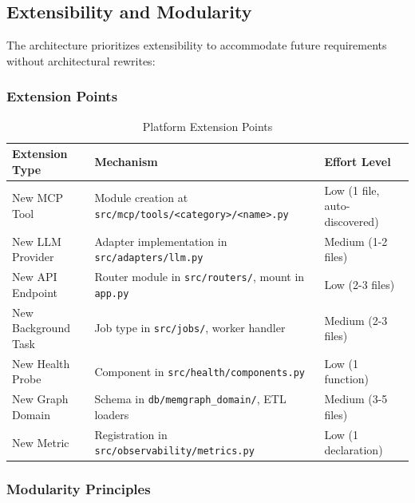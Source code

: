 \subsection{Extensibility and Modularity}
\label{subsec:extensibility}

The architecture prioritizes extensibility to accommodate future requirements without architectural rewrites:

\subsubsection{Extension Points}

\begin{table}[htbp]
\centering
\caption{Platform Extension Points}
\label{tab:extension-points}
\small
\begin{tabularx}{\textwidth}{|>{\raggedright\arraybackslash}p{2.8cm}|>{\raggedright\arraybackslash}X|>{\raggedright\arraybackslash}p{2.5cm}|}
\hline
\textbf{Extension Type} & \textbf{Mechanism} & \textbf{Effort Level} \\
\hline
New MCP Tool & Module creation at \texttt{src/mcp/tools/<category>/<name>.py} & Low (1 file, auto-discovered) \\
\hline
New LLM Provider & Adapter implementation in \texttt{src/adapters/llm.py} & Medium (1-2 files) \\
\hline
New API Endpoint & Router module in \texttt{src/routers/}, mount in \texttt{app.py} & Low (2-3 files) \\
\hline
New Background Task & Job type in \texttt{src/jobs/}, worker handler & Medium (2-3 files) \\
\hline
New Health Probe & Component in \texttt{src/health/components.py} & Low (1 function) \\
\hline
New Graph Domain & Schema in \texttt{db/memgraph\_domain/}, ETL loaders & Medium (3-5 files) \\
\hline
New Metric & Registration in \texttt{src/observability/metrics.py} & Low (1 declaration) \\
\hline
\end{tabularx}
\end{table}

\subsubsection{Modularity Principles}

